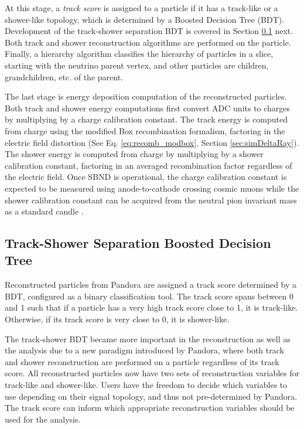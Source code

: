 At this stage, a \textit{track score} is assigned to a particle if it has a track-like or a shower-like topology, which is determined by a Boosted Decision Tree (BDT).
Development of the track-shower separation BDT is covered in Section \ref{sec:trkshwbdt} next.
Both track and shower reconstruction algorithms are performed on the particle. 
Finally, a hierarchy algorithm classifies the hierarchy of particles in a slice, starting with the neutrino parent vertex, and other particles are children, grandchildren, etc. of the parent.

The last stage is energy deposition computation of the reconstructed particles.
Both track and shower energy computations first convert ADC units to charges by multiplying by a charge calibration constant.
The track energy is computed from charge using the modified Box recombination formalism, factoring in the electric field distortion (See Eq. \ref{eq:recomb_modbox}, Section \ref{sec:simDeltaRay}).
The shower energy is computed from charge by multiplying by a shower calibration constant, factoring in an averaged recombination factor regardless of the electric field.
Once SBND is operational, the charge calibration constant is expected to be measured using anode-to-cathode crossing cosmic muons while the shower calibration constant can be acquired from the neutral pion invariant mass as a standard candle \cite{uboone_gamma}.

\subsection{Track-Shower Separation Boosted Decision Tree}
\label{sec:trkshwbdt}

Reconstructed particles from Pandora are assigned a track score determined by a BDT, configured as a binary classification tool.
The track score spans between 0 and 1 such that if a particle has a very high track score close to 1, it is track-like.
Otherwise, if its track score is very close to 0, it is shower-like.

The track-shower BDT became more important in the reconstruction as well as the analysis due to a new paradigm introduced by Pandora, where both track and shower reconstruction are performed on a particle regardless of its track score.
All reconstructed particles now have two sets of reconstruction variables for track-like and shower-like.
Users have the freedom to decide which variables to use depending on their signal topology, and thus not pre-determined by Pandora.
The track score can inform which appropriate reconstruction variables should be used for the analysis. 

